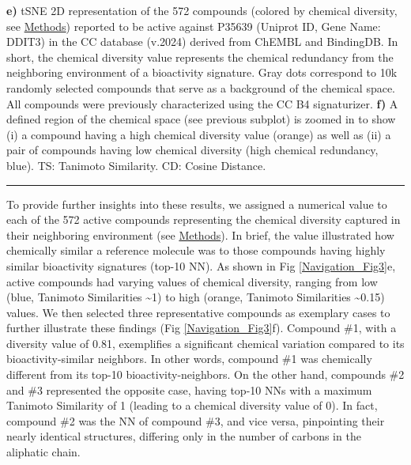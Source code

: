 \begin{Figure_modified}
{    \textbf{e)} tSNE 2D representation of the 572 compounds (colored by chemical diversity, see \hyperref[Navigation_Methods]{Methods}) reported to be active against P35639 (Uniprot ID, Gene Name: DDIT3) in the CC database (v.2024) derived from ChEMBL and BindingDB. In short, the chemical diversity value represents the chemical redundancy from the neighboring environment of a bioactivity signature. Gray dots correspond to 10k randomly selected compounds that serve as a background of the chemical space. All compounds were previously characterized using the CC B4 signaturizer\cite{bertoni_bioactivity_2021}.
    \textbf{f)} A defined region of the chemical space (see previous subplot) is zoomed in to show (i) a compound having a high chemical diversity value (orange) as well as (ii) a pair of compounds having low chemical diversity (high chemical redundancy, blue). TS: Tanimoto Similarity. CD: Cosine Distance. 
}
  \vspace{-5mm}
  \rule[0ex]{\textwidth}{0.5pt}
  \vspace{-9mm}
  \label{Navigation_Fig3}
\end{Figure_modified}


To provide further insights into these results, we assigned a numerical value to each of the 572 active compounds representing the chemical diversity captured in their neighboring environment (see \hyperref[Navigation_Methods]{Methods}). In brief, the value illustrated how chemically similar a reference molecule was to those compounds having highly similar bioactivity signatures (top-10 NN). As shown in Fig \ref{Navigation_Fig3}e, active compounds had varying values of chemical diversity, ranging from low (blue, Tanimoto Similarities \textasciitilde 1) to high (orange, Tanimoto Similarities \textasciitilde 0.15) values. We then selected three representative compounds as exemplary cases to further illustrate these findings (Fig \ref{Navigation_Fig3}f). Compound \#1, with a diversity value of 0.81, exemplifies a significant chemical variation compared to its bioactivity-similar neighbors. In other words, compound \#1 was chemically different from its top-10 bioactivity-neighbors. On the other hand, compounds \#2 and \#3 represented the opposite case, having top-10 NNs with a maximum Tanimoto Similarity of 1 (leading to a chemical diversity value of 0). In fact, compound \#2 was the NN of compound \#3, and vice versa, pinpointing their nearly identical structures, differing only in the number of carbons in the aliphatic chain. 


